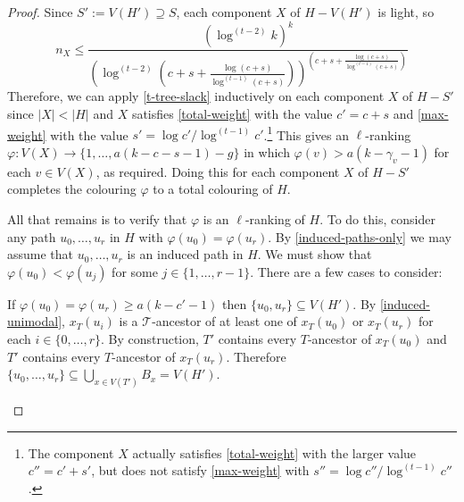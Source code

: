\documentclass[kpfonts]{patmorin}
\theoremstyle{named}
\begin{document}
\begin{proof}
    Since $S':=V(H')\supseteq S$, each component $X$ of $H-V(H')$ is light, so
    \[
       n_{X} \le \frac{(\log^{(t-2)} k)^k}{
        \left(
            \log^{(t-2)}
                \left(
                   c+s+\tfrac{\log(c+s)}{\log^{(t-1)}(c+s)}
               \right)
        \right)^{\left(
           c+s+\tfrac{\log(c+s)}{\log^{(t-1)}(c+s)}
       \right)}
       }
   \]
   Therefore, we can apply \cref{t-tree-slack} inductively on each component $X$ of $H-S'$ since $|X|<|H|$ and $X$ satisfies \cref{total-weight} with the value $c'=c+s$ and \cref{max-weight} with the value $s'=\log c'/\log^{(t-1)} c'$.\footnote{The component $X$ actually satisfies \cref{total-weight} with the larger value $c''=c'+s'$, but does not satisfy \cref{max-weight} with $s''=\log c''/\log^{(t-1)} c''$.}  This gives an $\ell$-ranking $\varphi:V(X)\to\{1,\ldots,a(k-c-s-1)-g\}$ in which $\varphi(v)> a(k-\gamma_v-1)$ for each $v\in V(X)$, as required.
   Doing this for each component $X$ of $H-S'$ completes the colouring $\varphi$ to a total colouring of $H$.

   All that remains is to verify that $\varphi$ is an $\ell$-ranking of $H$. To do this, consider any path $u_0,\ldots,u_r$ in $H$ with $\varphi(u_0)=\varphi(u_r)$.  By \cref{induced-paths-only} we may assume that $u_0,\ldots,u_r$ is an induced path in $H$.  We must show that $\varphi(u_0)<\varphi(u_j)$ for some $j\in\{1,\ldots,r-1\}$. There are a few cases to consider:
   \begin{compactenum}
        \item If $\varphi(u_0)=\varphi(u_r) \ge a(k-c'-1)$ then $\{u_0,u_r\}\subseteq V(H')$.  By \cref{induced-unimodal}, $x_T(u_i)$ is a $\mathcal{T}$-ancestor of at least one of $x_T(u_0)$ or $x_T(u_r)$ for each $i\in\{0,\ldots,r\}$.  By construction, $T'$ contains every $T$-ancestor of $x_T(u_0)$ and $T'$ contains every $T$-ancestor of $x_T(u_r)$.  Therefore $\{u_0,\ldots,u_r\}\subseteq \bigcup_{x\in V(T')} B_x=V(H')$.


\end{compactenum}
\end{proof}
\end{document}
